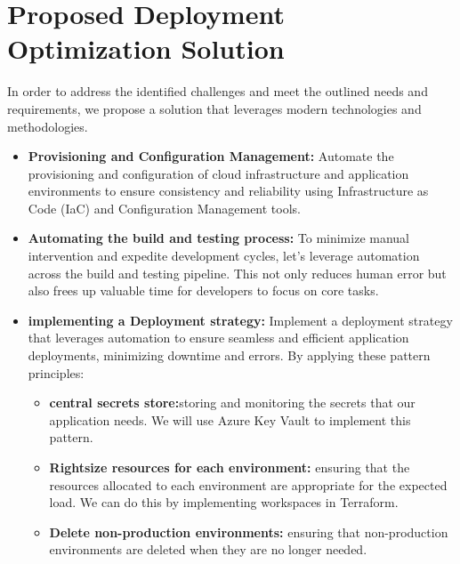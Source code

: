 \section{Proposed Deployment Optimization Solution}
In order to address the identified challenges and meet the outlined needs and requirements, we propose a solution that leverages modern technologies and methodologies.
\begin{itemize}

    \item \textbf{Provisioning and Configuration Management:}
          Automate the provisioning and configuration of cloud infrastructure and application environments to ensure consistency and reliability using Infrastructure as Code (IaC) and Configuration Management tools.

    \item \textbf{Automating the build and testing process:}
          To minimize manual intervention and expedite development cycles, let's leverage automation across the build and testing pipeline. This not only reduces human error but also frees up valuable time for developers to focus on core tasks.
    \item \textbf{implementing a Deployment strategy:}
          Implement a deployment strategy that leverages automation to ensure seamless and efficient application deployments, minimizing downtime and errors. By applying these pattern principles:
          \begin{itemize}
              \item \textbf{central secrets store:}storing and monitoring the secrets that our application needs. We will use Azure Key Vault to implement this pattern.
              \item \textbf{Rightsize resources for each environment:} ensuring that the resources allocated to each environment are appropriate for the expected load. We can do this by implementing workspaces in Terraform.
              \item \textbf{Delete non-production environments:} ensuring that non-production environments are deleted when they are no longer needed.
          \end{itemize}
\end{itemize}


